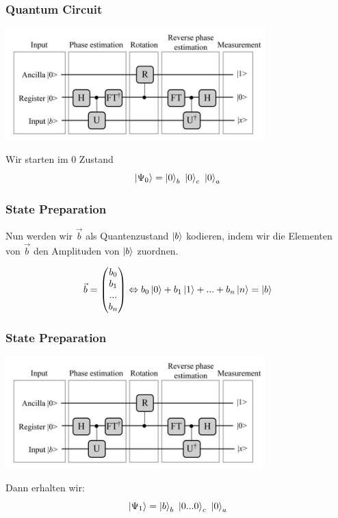\begin{frame}
    \frametitle{Quantum Circuit}
    \begin{center}
    \includegraphics[width=10cm]{img/hhl_circuit.jpg}
    \end{center}

    Wir starten im 0 Zustand
    $$\ket{\Psi_0} = \ket{0}_b\ \ket{0}_c\ \ket{0}_a$$


\end{frame}


\begin{frame}
    \frametitle{State Preparation}
    
    \hfil

    Nun werden wir $\vec{b}$ als Quantenzustand $\ket{b}$ kodieren, 
    indem wir die Elementen von $\vec{b}$ den Amplituden von $\ket{b}$ zuordnen.

    $$\vec{b}=\begin{pmatrix} b_0 \\ b_1 \\ ... \\b_n \end{pmatrix}
        \Leftrightarrow b_0 \ket{0} + b_1 \ket{1} + ... + b_n \ket{n} = \ket{b}$$

    \hfil

\end{frame}
\begin{frame}
    \frametitle{State Preparation}
    \begin{center}
    \includegraphics[width=10cm]{img/hhl_circuit.jpg}
    \end{center}

    Dann erhalten wir:
    $$\ket{\Psi_1} = \ket{b}_b\ \ket{0...0}_c\ \ket{0}_a$$


\end{frame}


